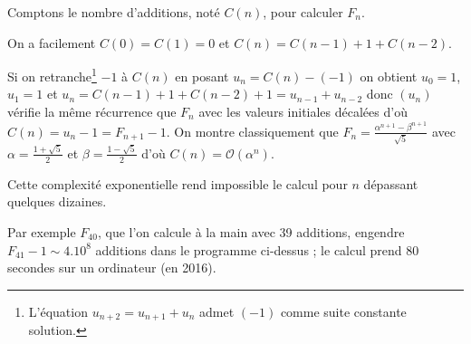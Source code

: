 Comptons le nombre d'additions, noté $C(n)$, pour calculer $F_n$.

On a facilement $C(0)=C(1)=0$ et $C(n)=C(n-1)+1+C(n-2)$.

Si on retranche\footnote{L'équation $u_{n+2} = u_{n+1}+u_n$ admet $(-1)$ comme suite constante solution.} $-1$ à $C(n)$ en posant $u_n=C(n)-(-1)$ on obtient $u_0=1$, $u_1=1$ et $u_{n} = C(n-1)+1+C(n-2) +1 =u_{n-1}+u_{n-2}$ donc $(u_n)$ vérifie la même récurrence que $F_n$ avec les valeurs initiales décalées d'où $C(n)=u_n-1=F_{n+1}-1$. On montre classiquement que $\displaystyle F_n = \frac{\alpha^{n+1}-\beta^{n+1}}{\sqrt 5}$ avec  $\displaystyle \alpha = \frac{1+\sqrt 5}2$ et  $\displaystyle \beta = \frac{1-\sqrt 5}2$ d'où   $C(n)={\mathcal O}(\alpha^n)$. 

Cette complexité exponentielle rend impossible le calcul pour $n$ dépassant quelques dizaines.

Par exemple $F_{40}$, que l'on calcule à la main avec 39 additions, engendre $F_{41}-1 \sim  4.10^8$ additions  dans le programme ci-dessus ; le calcul prend 80 secondes sur un ordinateur (en 2016).
\newpage

